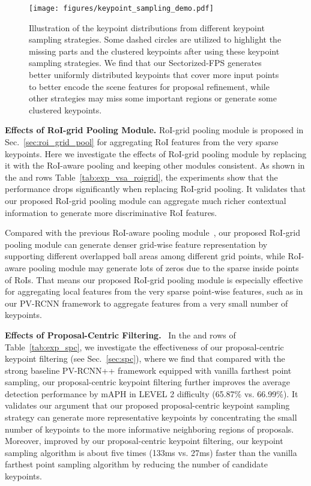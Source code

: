 \documentclass[natbib,twocolumn]{svjour3}          \smartqed  \usepackage{graphicx}
\begin{document}
\begin{figure*}
	\begin{center}
		\texttt{[image: figures/keypoint\_sampling\_demo.pdf]}
	\end{center}
	\vspace{-3.9mm}
	\caption{Illustration of the keypoint distributions from different keypoint sampling strategies. Some dashed circles are utilized to highlight the missing parts and the clustered keypoints after using these keypoint sampling strategies.
		We find that our Sectorized-FPS generates better uniformly distributed keypoints that cover more input points to better encode the scene features for proposal refinement, while other strategies may miss some important regions or generate some clustered keypoints.
	}
	\label{fig:spc}
\end{figure*}


\noindent
\textbf{Effects of RoI-grid Pooling Module.}
RoI-grid pooling module is proposed in Sec.~\ref{sec:roi_grid_pool} for aggregating RoI features from the very sparse keypoints.
Here we investigate the effects of RoI-grid pooling module by replacing it with the RoI-aware pooling \citep{shi2020part} and keeping other modules consistent. 
As shown in  the  and  rows Table~\ref{tab:exp_vsa_roigrid}, 
the experiments 
show that the performance drops significantly when replacing RoI-grid pooling. It validates that our proposed RoI-grid pooling module can aggregate much richer contextual information to generate more discriminative RoI features.


Compared with the previous RoI-aware pooling module~\citep{shi2020part}, our proposed RoI-grid pooling module can generate denser grid-wise feature representation by supporting different overlapped ball areas among different grid points, while RoI-aware pooling module may generate lots of zeros due to the sparse inside points of RoIs. 
That means our proposed RoI-grid pooling module is especially effective for aggregating local features from the very sparse point-wise features, such as in our PV-RCNN framework to aggregate features from a very small number of keypoints. 


\noindent
\textbf{Effects of Proposal-Centric Filtering.}~ 
In the  and  rows of Table~\ref{tab:exp_spc}, we investigate the effectiveness of our proposal-centric keypoint filtering (see Sec.~\ref{sec:spc}), 
where we find that compared with the strong baseline PV-RCNN++  framework equipped with vanilla farthest point sampling, our proposal-centric keypoint filtering further improves the average detection performance by  mAPH in LEVEL 2 difficulty (65.87\% vs. 66.99\%).
It validates our argument that our proposed proposal-centric keypoint sampling strategy can generate more representative keypoints by concentrating the small number of keypoints to the more informative neighboring regions of proposals. Moreover, improved by our proposal-centric keypoint filtering, our keypoint sampling algorithm is about five times (133ms vs. 27ms) faster than the vanilla farthest point sampling algorithm by reducing the number of candidate keypoints. 
\end{document}
